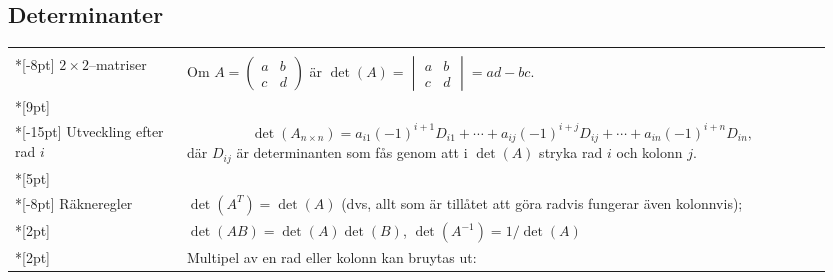 \documentclass[a4paper]{article}
\begin{document}
\subsection*{Determinanter}
\begin{tabular}{|p{0.2\linewidth}|p{0.75\linewidth}|}
  \hline
   & \\*[-8pt]
  $2\times2$--matriser &Om $A=\begin{pmatrix}a&b\\c&d\end{pmatrix}$ är 
  $\det(A)=\begin{vmatrix}a&b\\c&d\end{vmatrix}=ad-bc$.
  \\*[9pt] \hline & \\*[-15pt]
  \vfill
  Utveckling efter rad $i$ &
  $$
  \det(A_{n\times n})
  = a_{i1}(-1)^{i+1}D_{i1}
  + \cdots + a_{ij}(-1)^{i+j}D_{ij}
  + \cdots + a_{in}(-1)^{i+n}D_{in},
 $$ 
 där
 $D_{ij}$ är determinanten som fås 
 genom att i $\det(A)$ stryka rad $i$ och kolonn $j$.
  \\*[5pt] \hline & \\*[-8pt]
  Räkneregler &
  $\det(A^T)=\det(A)$ (dvs, allt som är tillåtet att göra 
                         radvis fungerar även kolonnvis);
  \\*[2pt]
  &
  $\det(AB)=\det(A)\det(B)$, 
  $\det(A^{-1})=1/\det(A)$
  \\*[2pt]
  &
  \parbox{10em}{Multipel av en rad eller kolonn kan bruytas ut:}

\end{tabular}
\end{document}
